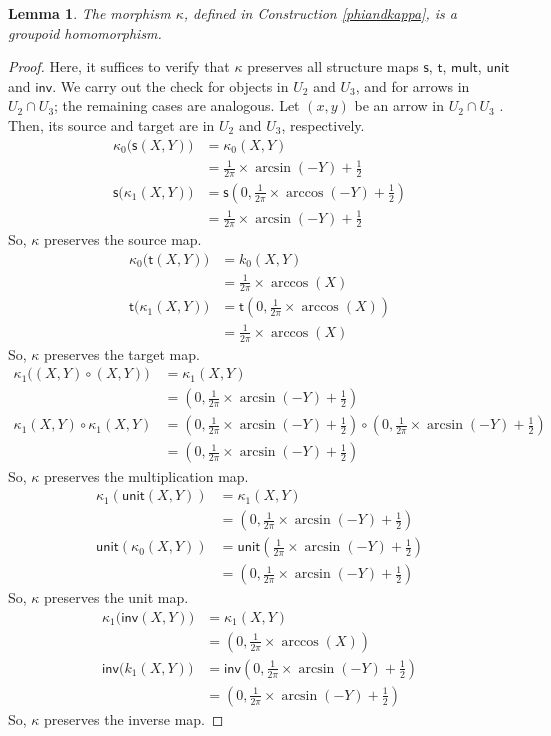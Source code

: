 \documentclass{article}
\theoremstyle{plain}
\newtheorem{lem}[thm]{Lemma}
\theoremstyle{definition}
\begin{document}
\begin{lem}
The morphism $\kappa$, defined in Construction \ref{phiandkappa}, is a groupoid homomorphism.
\end{lem}
\begin{proof}
Here, it suffices to verify that $\kappa$ preserves all structure maps $\mathsf{s}$, $\mathsf{t}$, $\mathsf{mult}$, $\mathsf{unit}$ and $\mathsf{inv}$. We carry out the check for objects in $U_2$ and $U_3$, and for arrows in $U_2 \cap U_3$; the remaining cases are analogous. Let $(x,y)$ be an arrow in $U_2 \cap U_3$ . Then, its source and target are in $U_2$ and $U_3$, respectively.
\begin{align*}
\kappa_0\big(\mathsf{s}(X,Y)\big) & = \kappa_0(X,Y) \\
& = \frac{1}{2\pi} \times \arcsin(-Y)+\frac{1}{2} \\
\mathsf{s}\big(\kappa_1(X,Y)\big) & = \mathsf{s}(0,\frac{1}{2\pi} \times \arccos(-Y)+\frac{1}{2}) \\
& = \frac{1}{2\pi} \times \arcsin(-Y)+\frac{1}{2}
\end{align*}
So, $\kappa$ preserves the source map.
\begin{align*}
\kappa_0\big(\mathsf{t}(X,Y)\big) & = k_0(X,Y) \\
& = \frac{1}{2\pi} \times \arccos(X) \\
\mathsf{t}\big(\kappa_1(X,Y)\big) & = \mathsf{t}(0,\frac{1}{2\pi} \times \arccos(X)) \\
& = \frac{1}{2\pi} \times \arccos(X)
\end{align*}
So, $\kappa$ preserves the target map.
\begin{align*}
\kappa_1\big((X,Y) \circ (X,Y)\big) & = \kappa_1(X,Y) \\
& = (0,\frac{1}{2\pi} \times \arcsin(-Y)+\frac{1}{2}) \\
\kappa_1(X,Y) \circ \kappa_1(X,Y) & = (0,\frac{1}{2\pi} \times \arcsin(-Y)+\frac{1}{2}) \circ (0,\frac{1}{2\pi} \times \arcsin(-Y)+\frac{1}{2}) \\ & = (0,\frac{1}{2\pi} \times \arcsin(-Y)+\frac{1}{2})
\end{align*}
So, $\kappa$ preserves the multiplication map.
\begin{align*}
\kappa_1(\mathsf{unit}(X,Y)) & = \kappa_1(X,Y) \\
& = (0,\frac{1}{2\pi} \times \arcsin(-Y) + \frac{1}{2}) \\
\mathsf{unit}(\kappa_0(X,Y)) & = \mathsf{unit}(\frac{1}{2\pi} \times \arcsin(-Y) + \frac{1}{2}) \\
& = (0,\frac{1}{2\pi} \times \arcsin(-Y) + \frac{1}{2})
\end{align*}
So, $\kappa$ preserves the unit map.
\begin{align*}
\kappa_1\big(\mathsf{inv}(X,Y)\big) & = \kappa_1(X,Y) \\
& = (0,\frac{1}{2\pi} \times \arccos(X)) \\
\mathsf{inv}\big(k_1(X,Y)\big) & = \mathsf{inv}(0,\frac{1}{2\pi} \times \arcsin(-Y)+\frac{1}{2}) \\
& = (0,\frac{1}{2\pi} \times \arcsin(-Y) + \frac{1}{2})
\end{align*}
So, $\kappa$ preserves the inverse map.
\end{proof}
\end{document}
